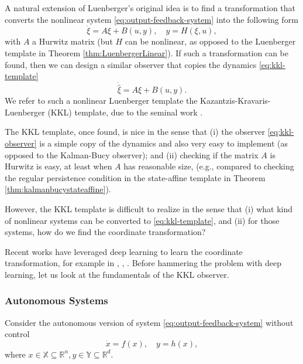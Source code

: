 \documentclass[
]{book}
\theoremstyle{definition}
\theoremstyle{definition}
\theoremstyle{definition}
\theoremstyle{definition}
\theoremstyle{remark}
\begin{document}
A natural extension of Luenberger's original idea is to find a transformation that converts the nonlinear system \eqref{eq:output-feedback-system} into the following form
\begin{equation}
\dot{\xi} = A \xi + B(u,y), \quad y = H(\xi,u),
\label{eq:kkl-template}
\end{equation}
with \(A\) a Hurwitz matrix (but \(H\) can be nonlinear, as opposed to the Luenberger template in Theorem \ref{thm:LuenbergerLinear}). If such a transformation can be found, then we can design a similar observer that copies the dynamics \eqref{eq:kkl-template}
\begin{equation}
\dot{\hat{\xi}} = A \hat{\xi} + B(u,y).
\label{eq:kkl-observer}
\end{equation}
We refer to such a nonlinear Luenberger template the Kazantzis-Kravaris-Luenberger (KKL) template, due to the seminal work \citep{kazantzis98scl-kkl}.

The KKL template, once found, is nice in the sense that (i) the observer \eqref{eq:kkl-observer} is a simple copy of the dynamics and also very easy to implement (as opposed to the Kalman-Bucy observer); and (ii) checking if the matrix \(A\) is Hurwitz is easy, at least when \(A\) has reasonable size, (e.g., compared to checking the regular persistence condition in the state-affine template in Theorem \ref{thm:kalmanbucystateaffine}).

However, the KKL template is difficult to realize in the sense that (i) what kind of nonlinear systems can be converted to \eqref{eq:kkl-template}, and (ii) for those systems, how do we find the coordinate transformation?

Recent works have leveraged deep learning to learn the coordinate transformation, for example in \citep{janny21cdc-deepkkl}, \citep{niazi23lacc-earning}, \citep{miao23ll4dc-earning}. Before hammering the problem with deep learning, let us look at the fundamentals of the KKL observer.

\hypertarget{autonomous-systems-1}{%
\subsubsection{Autonomous Systems}\label{autonomous-systems-1}}

Consider the autonomous version of system \eqref{eq:output-feedback-system} without control
\begin{equation}
\dot{x} = f(x), \quad y = h(x),
\label{eq:kkl-autonomous-system}
\end{equation}
where \(x \in \mathbb{X} \subseteq \mathbb{R}^n, y \in \mathbb{Y} \subseteq \mathbb{R}^d\).
\end{document}
